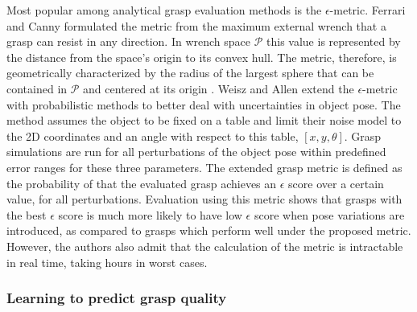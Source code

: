 Most popular among analytical grasp evaluation methods is the $\epsilon$-metric. Ferrari and Canny
\cite{FerrariCanny1992} formulated the metric from the maximum external wrench that a grasp can resist in any
direction. In wrench space $ \mathcal{P} $ this value is represented by the distance from the space's origin to its
convex hull. The metric, therefore, is geometrically characterized by the radius of the largest sphere that can be
contained in $ \mathcal{P} $ and centered at its origin \cite{Roa2015}. Weisz and Allen \cite{WeiszAllen2012} extend
the $\epsilon$-metric with probabilistic methods to better deal with uncertainties in object pose. The method assumes
the object to be fixed on a table and limit their noise model to the 2D coordinates and an angle with respect to this
table, $ [x, y, \theta] $. Grasp simulations are run for all perturbations of the object pose within predefined error
ranges for these three parameters. The extended grasp metric is defined as the probability of that the evaluated
grasp achieves an $ \epsilon $ score over a certain value, for all perturbations. Evaluation using this metric shows
that grasps with the best $ \epsilon $ score is much more likely to have low $ \epsilon $ score when pose variations
are introduced, as compared to grasps which perform well under the proposed metric. However, the authors also admit
that the calculation of the metric is intractable in real time, taking hours in worst cases.

\subsubsection*{Learning to predict grasp quality}

